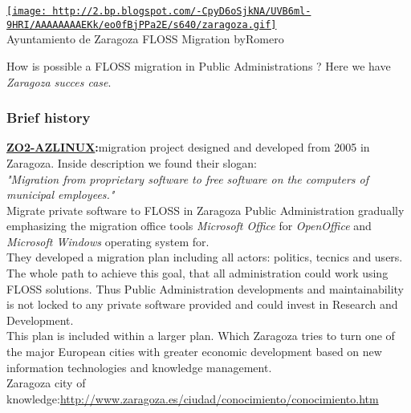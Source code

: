 
\begin{tabular}\href{http://2.bp.blogspot.com/-CpyD6oSjkNA/UVB6ml-9HRI/AAAAAAAAEKk/eo0fBjPPa2E/s1600/zaragoza.gif}{
\texttt{[image: http://2.bp.blogspot.com/-CpyD6oSjkNA/UVB6ml-9HRI/AAAAAAAAEKk/eo0fBjPPa2E/s640/zaragoza.gif]}} \\ 
Ayuntamiento de Zaragoza FLOSS Migration by\nolinebreakEduardo Romero
\end{tabular} How is possible a FLOSS migration in Public Administrations ? Here we have \textit{Zaragoza succes case}.
\\

\subsubsection{ Brief history}\textbf{\href{http://www.zaragoza.es/ciudad/sectores/tecnologia/swlibre/proyecto.htm}{ZO2-AZLINUX}:}\nolinebreakFLOSS migration project designed and developed from 2005 in Zaragoza. Inside description we found their slogan:
\\\textit{"Migration from proprietary software to free software on the computers of municipal employees."}
\\ Migrate private software to FLOSS in Zaragoza Public Administration gradually emphasizing the migration office tools \textit{Microsoft Office} for \textit{OpenOffice} and \textit{Microsoft Windows} operating system for.
\\ They developed a migration plan including all actors: politics, tecnics and users. The whole path to achieve this goal, that all administration could work using FLOSS solutions. Thus Public Administration developments and maintainability is not locked to any private software provided and could invest in Research and Development.
\\ This plan is included within a larger plan. Which Zaragoza tries to turn one of the major European cities with greater economic development based on new information technologies and knowledge management.
\\ Zaragoza city of knowledge:\nolinebreak\href{http://www.zaragoza.es/ciudad/conocimiento/conocimiento.htm}{http://www.zaragoza.es/ciudad/conocimiento/conocimiento.htm}

